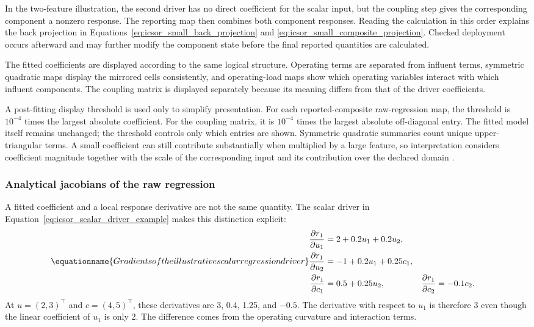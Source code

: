 In the two-feature illustration, the second driver has no direct coefficient for the scalar input, but the coupling step gives the corresponding component a nonzero response. The reporting map then combines both component responses. Reading the calculation in this order explains the back projection in Equations~\eqref{eq:icsor_small_back_projection} and \eqref{eq:icsor_small_composite_projection}. Checked deployment occurs afterward and may further modify the component state before the final reported quantities are calculated.

The fitted coefficients are displayed according to the same logical structure. Operating terms are separated from influent terms, symmetric quadratic maps display the mirrored cells consistently, and operating-load maps show which operating variables interact with which influent components. The coupling matrix is displayed separately because its meaning differs from that of the driver coefficients.

A post-fitting display threshold is used only to simplify presentation. For each reported-composite raw-regression map, the threshold is \(10^{-4}\) times the largest absolute coefficient. For the coupling matrix, it is \(10^{-4}\) times the largest absolute off-diagonal entry. The fitted model itself remains unchanged; the threshold controls only which entries are shown. Symmetric quadratic summaries count unique upper-triangular terms. A small coefficient can still contribute substantially when multiplied by a large feature, so interpretation considers coefficient magnitude together with the scale of the corresponding input and its contribution over the declared domain \citep{Selerio2026,Nazlabadi2021}.

\subsubsection{Analytical jacobians of the raw regression}

A fitted coefficient and a local response derivative are not the same quantity. The scalar driver in Equation~\eqref{eq:icsor_scalar_driver_example} makes this distinction explicit:
\begin{equation}
\equationname{Gradients of the illustrative scalar regression driver}
\label{eq:icsor_scalar_driver_derivatives}
\begin{aligned}
\frac{\partial r_1}{\partial u_1}&=2+0.2u_1+0.2u_2,\\
\frac{\partial r_1}{\partial u_2}&=-1+0.2u_1+0.25c_1,\\
\frac{\partial r_1}{\partial c_1}&=0.5+0.25u_2,
&\frac{\partial r_1}{\partial c_2}&=-0.1c_2.
\end{aligned}
\end{equation}
At \(u=(2,3)^\top\) and \(c=(4,5)^\top\), these derivatives are 3, 0.4, 1.25, and \(-0.5\). The derivative with respect to \(u_1\) is therefore 3 even though the linear coefficient of \(u_1\) is only 2. The difference comes from the operating curvature and interaction terms.

